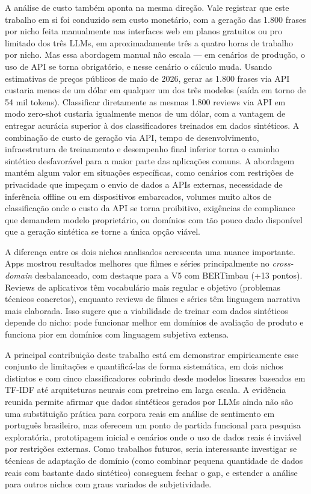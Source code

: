 \documentclass[12pt]{article}
\begin{document}
A análise de custo também aponta na mesma direção. Vale registrar que este trabalho em si foi conduzido sem custo monetário, com a geração das 1.800 frases por nicho feita manualmente nas interfaces web em planos gratuitos ou pro limitado dos três LLMs, em aproximadamente três a quatro horas de trabalho por nicho. Mas essa abordagem manual não escala — em cenários de produção, o uso de API se torna obrigatório, e nesse cenário o cálculo muda. Usando estimativas de preços públicos de maio de 2026, gerar as 1.800 frases via API custaria menos de um dólar em qualquer um dos três modelos (saída em torno de 54 mil tokens). Classificar diretamente as mesmas 1.800 reviews via API em modo zero-shot custaria igualmente menos de um dólar, com a vantagem de entregar acurácia superior à dos classificadores treinados em dados sintéticos. A combinação de custo de geração via API, tempo de desenvolvimento, infraestrutura de treinamento e desempenho final inferior torna o caminho sintético desfavorável para a maior parte das aplicações comuns. A abordagem mantém algum valor em situações específicas, como cenários com restrições de privacidade que impeçam o envio de dados a APIs externas, necessidade de inferência offline ou em dispositivos embarcados, volumes muito altos de classificação onde o custo da API se torna proibitivo, exigências de compliance que demandem modelo proprietário, ou domínios com tão pouco dado disponível que a geração sintética se torne a única opção viável.

A diferença entre os dois nichos analisados acrescenta uma nuance importante. Apps mostrou resultados melhores que filmes e séries principalmente no \textit{cross-domain} desbalanceado, com destaque para a V5 com BERTimbau (+13 pontos). Reviews de aplicativos têm vocabulário mais regular e objetivo (problemas técnicos concretos), enquanto reviews de filmes e séries têm linguagem narrativa mais elaborada. Isso sugere que a viabilidade de treinar com dados sintéticos depende do nicho: pode funcionar melhor em domínios de avaliação de produto e funciona pior em domínios com linguagem subjetiva extensa.

A principal contribuição deste trabalho está em demonstrar empiricamente esse conjunto de limitações e quantificá-las de forma sistemática, em dois nichos distintos e com cinco classificadores cobrindo desde modelos lineares baseados em TF-IDF até arquiteturas neurais com pretreino em larga escala. A evidência reunida permite afirmar que dados sintéticos gerados por LLMs ainda não são uma substituição prática para corpora reais em análise de sentimento em português brasileiro, mas oferecem um ponto de partida funcional para pesquisa exploratória, prototipagem inicial e cenários onde o uso de dados reais é inviável por restrições externas. Como trabalhos futuros, seria interessante investigar se técnicas de adaptação de domínio (como combinar pequena quantidade de dados reais com bastante dado sintético) conseguem fechar o gap, e estender a análise para outros nichos com graus variados de subjetividade.




\end{document}
